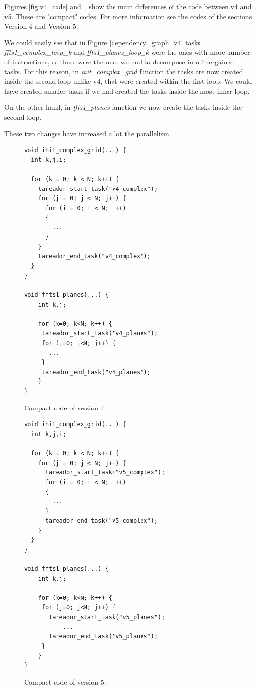 \documentclass[12pt, a4paper]{article}
\begin{document}
Figures \ref{fig:v4_code} and \ref{fig:v5_code} show the main differences of the code between v4 and v5. These are "compact" codes. For more information see the codes of the sections Version 4 and Version 5.

We could easily see that in Figure \ref{dependency_graph_v4} tasks \textit{ffts1\_complex\_loop\_k} and \textit{ffts1\_planes\_loop\_k} were the ones with more number of instructions, so these were the ones we had to decompose into finer\textendash gained tasks. For this reason, in \textit{init\_complex\_grid} function the tasks are now created inside the second loop unlike v4, that were created within the first loop. We could have created smaller tasks if we had created the tasks inside the most inner loop.

On the other hand, in \textit{ffts1\_planes} function we now create the tasks inside the second loop.

These two changes have increased a lot the parallelism.

\begin{figure}[H]
\begin{minipage}[b]{0.55\linewidth}

\begin{lstlisting}
void init_complex_grid(...) {
  int k,j,i;

  for (k = 0; k < N; k++) {
    tareador_start_task("v4_complex");
    for (j = 0; j < N; j++) {
      for (i = 0; i < N; i++)
      {
        ...
      }
    }
    tareador_end_task("v4_complex");
  }
}

void ffts1_planes(...) {
    int k,j;

    for (k=0; k<N; k++) {
     tareador_start_task("v4_planes");
     for (j=0; j<N; j++) {
       ...
     }
     tareador_end_task("v4_planes");
    }
}
\end{lstlisting}

\caption{Compact code of version 4.}
\label{fig:v4_code}
\end{minipage}
\hspace{0.5cm}
\begin{minipage}[b]{0.57\linewidth}

\begin{lstlisting}
void init_complex_grid(...) {
  int k,j,i;

  for (k = 0; k < N; k++) {
    for (j = 0; j < N; j++) {
      tareador_start_task("v5_complex");
      for (i = 0; i < N; i++)
      {
        ...
      }
      tareador_end_task("v5_complex");
    }
  }
}

void ffts1_planes(...) {
    int k,j;

    for (k=0; k<N; k++) {
     for (j=0; j<N; j++) {
       tareador_start_task("v5_planes");
           ...
       tareador_end_task("v5_planes");
     }
    }
}
\end{lstlisting}

\caption{Compact code of version 5.}
\label{fig:v5_code}
\end{minipage}
\end{figure}
\end{document}
